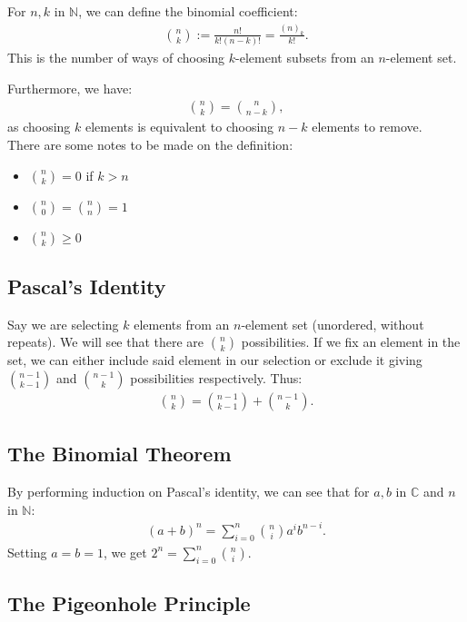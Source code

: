 \documentclass[a4paper, 12pt, twoside]{article}
\begin{document}
For $n, k$ in $\mathbb{N}$, we can define the binomial coefficient:  \begin{align*}
 {n \choose k} := \frac{n!}{k!(n-k)!} = \frac{(n)_k}{k!}.
\end{align*}
This is the number of ways of choosing $k$-element subsets
from an $n$-element set. 

\newpage

Furthermore, we have: \begin{gather*}
  {n \choose k} = {n \choose n - k},
\end{gather*} as choosing $k$ elements is equivalent to choosing
$n - k$ elements to remove.
\\[\baselineskip]
There are some notes to be made on the definition: \begin{itemize}
  \item ${n \choose k} = 0$ if $k > n$
  \item ${n \choose 0} = {n \choose n} = 1$
  \item ${n \choose k} \geq 0$
\end{itemize}

\subsection{Pascal's Identity}

Say we are selecting $k$ elements from an $n$-element set (unordered, 
without repeats). We will see that there are ${n \choose k}$ possibilities.
If we fix an element in the set, we can either include said element in
our selection or exclude it giving ${n - 1 \choose k - 1}$ and 
${n - 1 \choose k}$ possibilities respectively. Thus: \begin{gather*}
  {n \choose k} = {n - 1 \choose k - 1} + {n - 1 \choose k}.
\end{gather*}

\subsection{The Binomial Theorem}

By performing induction on Pascal's identity, we can see that for 
$a, b$ in $\mathbb{C}$ and $n$ in $\mathbb{N}$: \begin{gather*}
  (a + b)^n = \sum_{i = 0}^n {n \choose i}a^ib^{n - i}.
\end{gather*} Setting $a = b = 1$, we get $2^n = \sum_{i = 0}^n 
{n \choose i}$.

\subsection{The Pigeonhole Principle}
\end{document}

